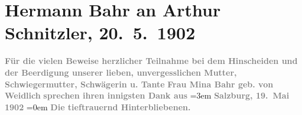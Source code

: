 

         
         \renewcommand{\erwaehntePersonen}{Personen: Hermann Bahr, Wilhelmine Bahr}
         \renewcommand{\erwaehnteOrte}{Orte: Salzburg, Wien}
         \renewcommand{\erwaehnteWerke}{Werke: Lebendige Stunden (Vier Einacter von Arthur Schnitzler: »Lebendige Stunden«, »Die Frau mit dem Dolche«, »Die letzten Masken« und »Literatur«. Zum ersten Male aufgeführt im Carl-Theater am 6. Mai 1902. Erste Vorstellung des Berliner Deutschen Theaters), Lebendige Stunden. Vier Einakter}
               \section[Hermann Bahr an Arthur Schnitzler, 20. 5. 1902]{ Hermann Bahr an Arthur Schnitzler, 20. 5. 1902}\nopagebreak{}\rehead{ }\begin{ledgroupsized}[t]{13cm}\normalsize\beginnumbering{} \toendnotes[C]{\smallbreak\pagebreak[2]} 
\toendnotes[C]{\smallbreak}\pstart
           \noindent{}{\pb}\textcolor{gray}{\textbf{Für die vielen Beweise herzlicher Teilnahme bei dem
                     Hinscheiden und der Beerdigung unserer lieben, unvergesslichen Mutter,
                     Schwiegermutter, Schwägerin u. Tante}}\pend
           \pstart
           \textcolor{gray}{\textbf{Frau Mina Bahr geb. von
                        Weidlich}}\pend
           \pstart
           \textcolor{gray}{\textbf{sprechen ihren innigsten Dank aus}}\pend
           \leftskip=3em{}\pstart
           \noindent{}\textcolor{gray}{\textbf{Salzburg, 19. Mai
                        1902}}\pend
           \leftskip=0em{}\pstart
           \noindent{}\raggedleft{}\textcolor{gray}{\textbf{Die tieftrauernd Hinterbliebenen.}}\pend

\end{ledgroupsized}
